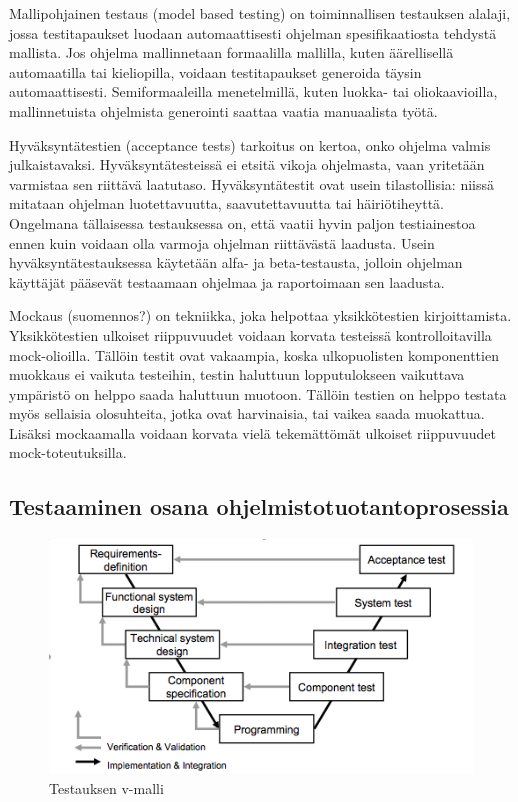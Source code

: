 Mallipohjainen testaus (model based testing) on toiminnallisen testauksen alalaji, jossa testitapaukset luodaan automaattisesti ohjelman spesifikaatiosta tehdystä mallista. Jos ohjelma mallinnetaan formaalilla mallilla, kuten äärellisellä automaatilla tai kieliopilla, voidaan testitapaukset generoida täysin automaattisesti. Semiformaaleilla menetelmillä, kuten luokka- tai oliokaavioilla, mallinnetuista ohjelmista generointi saattaa vaatia manuaalista työtä. \cite[245-250]{testing}

Hyväksyntätestien (acceptance tests) tarkoitus on kertoa, onko ohjelma valmis julkaistavaksi. Hyväksyntätesteissä ei etsitä vikoja ohjelmasta, vaan yritetään varmistaa sen riittävä laatutaso. Hyväksyntätestit ovat usein tilastollisia: niissä mitataan ohjelman luotettavuutta, saavutettavuutta tai häiriötiheyttä. Ongelmana tällaisessa testauksessa on, että vaatii hyvin paljon testiainestoa ennen kuin voidaan olla varmoja ohjelman riittävästä laadusta. Usein hyväksyntätestauksessa käytetään alfa- ja beta-testausta, jolloin ohjelman käyttäjät pääsevät testaamaan ohjelmaa ja raportoimaan sen laadusta. \cite[421-423]{testing}

Mockaus (suomennos?) on tekniikka, joka helpottaa yksikkötestien kirjoittamista. Yksikkötestien ulkoiset riippuvuudet voidaan korvata testeissä kontrolloitavilla mock-olioilla. Tällöin testit ovat vakaampia, koska ulkopuolisten komponenttien muokkaus ei vaikuta testeihin, testin haluttuun lopputulokseen vaikuttava ympäristö on helppo saada haluttuun muotoon. Tällöin testien on helppo testata myös sellaisia olosuhteita, jotka ovat harvinaisia, tai vaikea saada muokattua. Lisäksi mockaamalla voidaan korvata vielä tekemättömät ulkoiset riippuvuudet mock-toteutuksilla. \cite{mocking}

\subsection{Testaaminen osana ohjelmistotuotantoprosessia}

\begin{figure}[htb]
\includegraphics[width=130mm]{v_model.png}
\caption{Testauksen v-malli} \label{v_model}
\end{figure}

